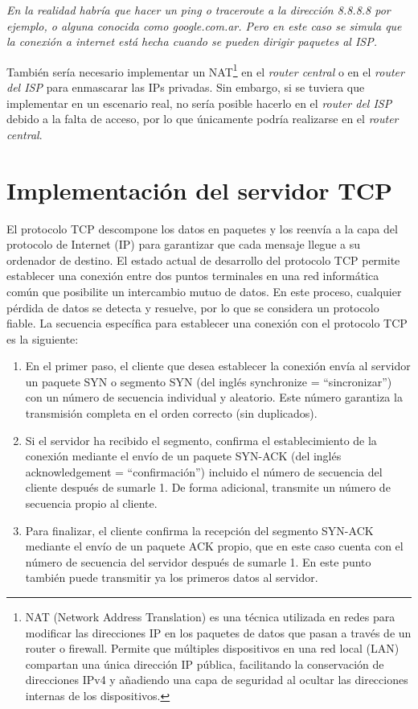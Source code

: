 \documentclass[letterpaper, 10 pt, conference]{ieeeconf}  %
\begin{document}
\textit{En la realidad habría que hacer un ping o traceroute a la dirección 8.8.8.8 por ejemplo, o alguna conocida como google.com.ar. Pero en este caso se simula que la conexión a internet está hecha cuando se pueden dirigir paquetes al ISP.}

También sería necesario implementar un NAT\footnote{NAT (Network Address Translation) es una técnica utilizada en redes para modificar las direcciones IP en los paquetes de datos que pasan a través de un router o firewall. Permite que múltiples dispositivos en una red local (LAN) compartan una única dirección IP pública, facilitando la conservación de direcciones IPv4 y añadiendo una capa de seguridad al ocultar las direcciones internas de los dispositivos.} en el \textit{router central} o en el \textit{router del ISP} para enmascarar las IPs privadas. Sin embargo, si se tuviera que implementar en un escenario real, no sería posible hacerlo en el \textit{router del ISP} debido a la falta de acceso, por lo que únicamente podría realizarse en el \textit{router central}.

\section{Implementación del servidor TCP}

El protocolo TCP descompone los datos en paquetes y los reenvía a la capa del protocolo de Internet (IP) para garantizar que cada mensaje llegue a su ordenador de destino. El estado actual de desarrollo del protocolo TCP permite establecer una conexión entre dos puntos terminales en una red informática común que posibilite un intercambio mutuo de datos. En este proceso, cualquier pérdida de datos se detecta y resuelve, por lo que se considera un protocolo fiable. La secuencia específica para establecer una conexión con el protocolo TCP es la siguiente:

\begin{enumerate}
	\item En el primer paso, el cliente que desea establecer la conexión envía al servidor un paquete SYN o segmento SYN (del inglés synchronize = “sincronizar”) con un número de secuencia individual y aleatorio. Este número garantiza la transmisión completa en el orden correcto (sin duplicados).
	\item Si el servidor ha recibido el segmento, confirma el establecimiento de la conexión mediante el envío de un paquete SYN-ACK (del inglés acknowledgement = “confirmación”) incluido el número de secuencia del cliente después de sumarle 1. De forma adicional, transmite un número de secuencia propio al cliente.
	\item Para finalizar, el cliente confirma la recepción del segmento SYN-ACK mediante el envío de un paquete ACK propio, que en este caso cuenta con el número de secuencia del servidor después de sumarle 1. En este punto también puede transmitir ya los primeros datos al servidor.
\end{enumerate}
\end{document}
